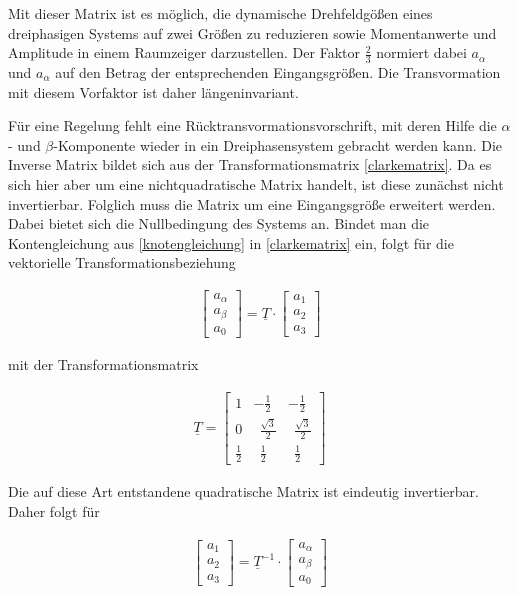 Mit dieser Matrix ist es möglich, die dynamische Drehfeldgößen eines dreiphasigen Systems auf zwei Größen zu reduzieren sowie Momentanwerte und Amplitude in einem Raumzeiger darzustellen.
Der Faktor $\frac{2}{3}$ normiert dabei $a_{\alpha}$ und $a_{\alpha}$ auf den Betrag der entsprechenden Eingangsgrößen.
Die Transvormation mit diesem Vorfaktor ist daher längeninvariant.

Für eine Regelung fehlt eine Rücktransvormationsvorschrift, mit deren Hilfe die $\alpha$- und $\beta$-Komponente wieder in ein Dreiphasensystem gebracht werden kann.
Die Inverse Matrix bildet sich aus der Transformationsmatrix \ref{clarkematrix}. 
Da es sich hier aber um eine nichtquadratische Matrix handelt, ist diese zunächst nicht invertierbar.
Folglich muss die Matrix um eine Eingangsgröße erweitert werden.
Dabei bietet sich die Nullbedingung des Systems an.
Bindet man die Kontengleichung aus \ref{knotengleichung} in \ref{clarkematrix} ein, folgt für die vektorielle Transformationsbeziehung

\begin{align}
	\begin{bmatrix}
		a_{\alpha} \\
		a_{\beta} \\
		a_{0}
	\end{bmatrix}
	=\underline{T}\cdot 
	\begin{bmatrix}
		a_{1} \\
		a_{2} \\
		a_{3}
	\end{bmatrix}
	\label{clarkevektornull}
	\end{align}

mit der Transformationsmatrix

\begin{align}
	\underline{T} =
	\begin{bmatrix}
		1 & -\frac{1}{2} & -\frac{1}{2}  \\
		0 & ~~\frac{\sqrt{3}}{2} & ~~\frac{\sqrt{3}}{2} \\
		\frac{1}{2} & ~~\frac{1}{2} & ~~\frac{1}{2}
	\end{bmatrix}
	\label{clarkematrixnull}
\end{align} 

Die auf diese Art entstandene quadratische Matrix ist eindeutig invertierbar.
Daher folgt für

\begin{align}
	\begin{bmatrix}
	a_{1} \\
	a_{2} \\
	a_{3}
	\end{bmatrix}
	=\underline{T}^{-1}\cdot 
	\begin{bmatrix}
	a_{\alpha} \\
	a_{\beta} \\
	a_{0}
	\end{bmatrix}
	\label{inverseclarkevektornull}
\end{align}

